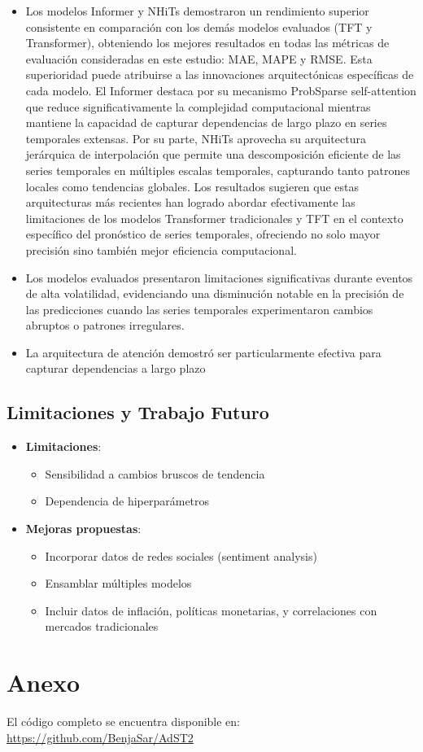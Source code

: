 \documentclass[12pt]{article}
\begin{document}
\begin{itemize}
\item Los modelos Informer y NHiTs demostraron un rendimiento superior consistente en comparación con los demás modelos evaluados (TFT y Transformer), obteniendo los mejores resultados en todas las métricas de evaluación consideradas en este estudio: MAE, MAPE y RMSE.
Esta superioridad puede atribuirse a las innovaciones arquitectónicas específicas de cada modelo. El Informer destaca por su mecanismo ProbSparse self-attention que reduce significativamente la complejidad computacional mientras mantiene la capacidad de capturar dependencias de largo plazo en series temporales extensas. Por su parte, NHiTs aprovecha su arquitectura jerárquica de interpolación que permite una descomposición eficiente de las series temporales en múltiples escalas temporales, capturando tanto patrones locales como tendencias globales.
Los resultados sugieren que estas arquitecturas más recientes han logrado abordar efectivamente las limitaciones de los modelos Transformer tradicionales y TFT en el contexto específico del pronóstico de series temporales, ofreciendo no solo mayor precisión sino también mejor eficiencia computacional.
\item Los modelos evaluados presentaron limitaciones significativas durante eventos de alta volatilidad, evidenciando una disminución notable en la precisión de las predicciones cuando las series temporales experimentaron cambios abruptos o patrones irregulares.
\item La arquitectura de atención demostró ser particularmente efectiva para capturar dependencias a largo plazo
\end{itemize}

\subsection{Limitaciones y Trabajo Futuro}

\begin{itemize}
\item \textbf{Limitaciones}:
\begin{itemize}
\item Sensibilidad a cambios bruscos de tendencia
\item Dependencia de hiperparámetros
\end{itemize}

\item \textbf{Mejoras propuestas}:
\begin{itemize}
\item Incorporar datos de redes sociales (sentiment analysis)
\item Ensamblar múltiples modelos
\item Incluir datos de inflación, políticas monetarias, y correlaciones con mercados tradicionales
\end{itemize}
\end{itemize}


\newpage
\section*{Anexo}
El código completo se encuentra disponible en: \\
\url{https://github.com/BenjaSar/AdST2}
\end{document}
